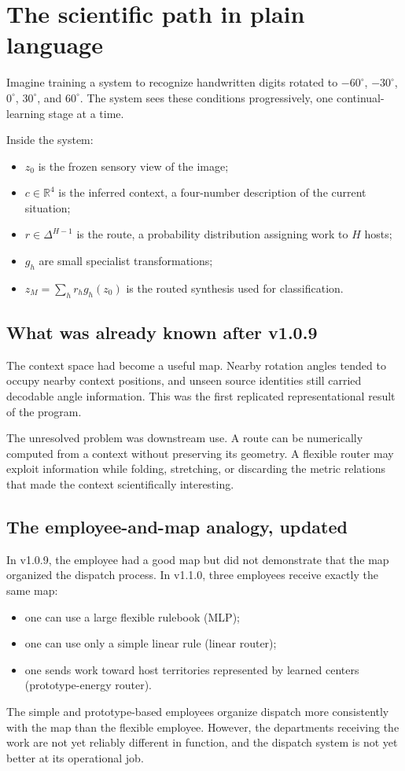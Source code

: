 \documentclass[11pt,a4paper]{article}
\newcommand{\R}{\mathbb{R}}
\begin{document}
\section{The scientific path in plain language}
\begin{plainbox}
Imagine training a system to recognize handwritten digits rotated to $-60^\circ$, $-30^\circ$, $0^\circ$, $30^\circ$, and $60^\circ$. The system sees these conditions progressively, one continual-learning stage at a time.

Inside the system:
\begin{itemize}
\item $z_0$ is the frozen sensory view of the image;
\item $c\in\R^4$ is the inferred context, a four-number description of the current situation;
\item $r\in\Delta^{H-1}$ is the route, a probability distribution assigning work to $H$ hosts;
\item $g_h$ are small specialist transformations;
\item $z_M=\sum_h r_h g_h(z_0)$ is the routed synthesis used for classification.
\end{itemize}
\end{plainbox}

\subsection{What was already known after v1.0.9}
The context space had become a useful map. Nearby rotation angles tended to occupy nearby context positions, and unseen source identities still carried decodable angle information. This was the first replicated representational result of the program.

The unresolved problem was downstream use. A route can be numerically computed from a context without preserving its geometry. A flexible router may exploit information while folding, stretching, or discarding the metric relations that made the context scientifically interesting.

\subsection{The employee-and-map analogy, updated}
In v1.0.9, the employee had a good map but did not demonstrate that the map organized the dispatch process. In v1.1.0, three employees receive exactly the same map:
\begin{itemize}
\item one can use a large flexible rulebook (MLP);
\item one can use only a simple linear rule (linear router);
\item one sends work toward host territories represented by learned centers (prototype-energy router).
\end{itemize}
The simple and prototype-based employees organize dispatch more consistently with the map than the flexible employee. However, the departments receiving the work are not yet reliably different in function, and the dispatch system is not yet better at its operational job.
\end{document}
